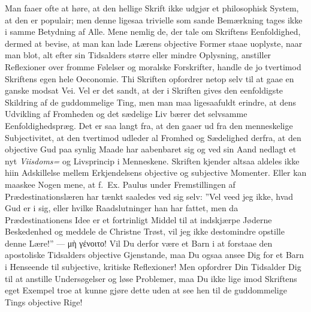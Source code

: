\documentclass[12pt]{book}
\newcommand{\opage}[1]{\marginnote{\footnotesize\textit{[#1]}}}
\begin{document}
\opage{115} Man faaer ofte at høre, at den hellige Skrift ikke udgjør et philosophisk
System, at den er populair; men denne ligesaa trivielle som sande Bemærkning
tages ikke i samme Betydning af Alle. Mene nemlig de, der tale om Skriftens
Eenfoldighed, dermed at bevise, at man kan lade Lærens objective Former staae
uoplyste, naar man blot, alt efter sin Tidsalders større eller mindre
Oplysning, anstiller Reflexioner over fromme Følelser og moralske Forskrifter,
handle de jo tvertimod Skriftens egen hele Oeconomie. Thi Skriften opfordrer
netop selv til at gaae en ganske modsat Vei. Vel er det sandt, at der i
Skriften gives den eenfoldigste Skildring af de guddommelige Ting, men man maa
ligesaafuldt erindre, at dens Udvikling af Fromheden og det sædelige Liv bærer
det selvsamme Eenfoldighedspræg. Det er saa langt fra, at den
\opage{116} gaaer ud fra den menneskelige Subjectivitet, at den tvertimod udleder al
Fromhed og Sædelighed derfra, at den objective Gud paa synlig Maade har
aabenbaret sig og ved sin Aand nedlagt et nyt \emph{Viisdoms=} og Livsprincip
i Menneskene. Skriften kjender altsaa aldeles ikke hiin Adskillelse mellem
Erkjendelsens objective og subjective Momenter. Eller kan maaskee Nogen mene,
at f.~Ex. Paulus under Fremstillingen af Prædestinationslæren har tænkt
saaledes ved sig selv: ”Vel veed jeg ikke, hvad Gud er i sig, eller hvilke
Raadslutninger han har fattet, men da Prædestinationens Idee er et fortrinligt
Middel til at indskjærpe Jøderne Beskedenhed og meddele de Christne Trøst, vil
jeg ikke destomindre opstille denne Lære!” --- μὴ γένοιτο! Vil Du derfor være
et Barn i at forstaae den apostoliske Tidsalders objective Gjenstande, maa Du
ogsaa ansee Dig for et Barn i Henseende til subjective, kritiske Reflexioner!
Men opfordrer Din Tidsalder Dig til at anstille Undersøgelser og løse
Problemer, maa Du ikke lige imod Skriftens eget Exempel troe at kunne gjøre
dette uden at see hen til de guddommelige Tings objective Rige!
\end{document}
